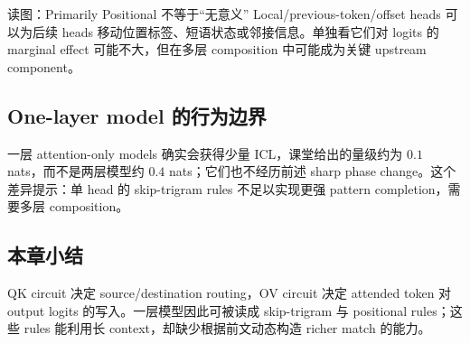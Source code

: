 

\begin{knowledgebox}{读图：Primarily Positional 不等于“无意义”}
Local/previous-token/offset heads 可以为后续 heads 移动位置标签、短语状态或邻接信息。单独看它们对 logits 的 marginal effect 可能不大，但在多层 composition 中可能成为关键 upstream component。
\end{knowledgebox}

\subsection{One-layer model 的行为边界}

一层 attention-only models 确实会获得少量 ICL，课堂给出的量级约为 $0.1$ nats，而不是两层模型约 $0.4$ nats；它们也不经历前述 sharp phase change。这个差异提示：单 head 的 skip-trigram rules 不足以实现更强 pattern completion，需要多层 composition。



\subsection{本章小结}

QK circuit 决定 source/destination routing，OV circuit 决定 attended token 对 output logits 的写入。一层模型因此可被读成 skip-trigram 与 positional rules；这些 rules 能利用长 context，却缺少根据前文动态构造 richer match 的能力。


